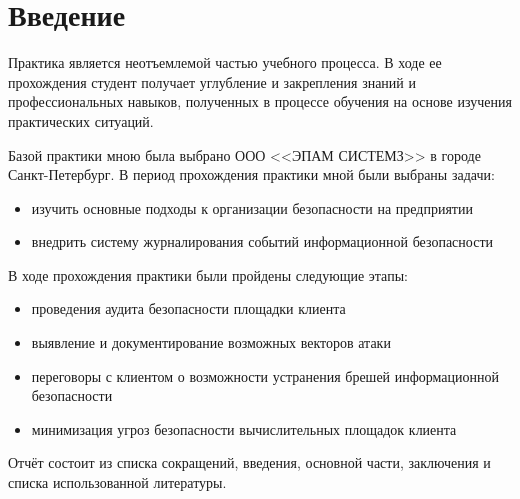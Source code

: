 \section*{Введение}
%

Практика является неотъемлемой частью учебного процесса. В ходе ее прохождения студент получает углубление и закрепления знаний и профессиональных навыков, полученных в процессе обучения на основе изучения практических ситуаций. 

Базой практики мною была выбрано ООО <<ЭПАМ СИСТЕМЗ>> в городе Санкт-Петербург.
В период прохождения практики мной были выбраны задачи:
\begin{itemize}
	\item изучить основные подходы к организации безопасности на предприятии
	\item внедрить систему журналирования событий информационной безопасности
\end{itemize}

В ходе прохождения практики были пройдены следующие этапы:

\begin{itemize}
	\item проведения аудита безопасности площадки клиента
	\item выявление и документирование возможных векторов атаки
	\item переговоры с клиентом о возможности устранения брешей информационной безопасности
	\item минимизация угроз безопасности вычислительных площадок клиента
\end{itemize}

Отчёт состоит из списка сокращений, введения, основной части, заключения и списка использованной литературы.